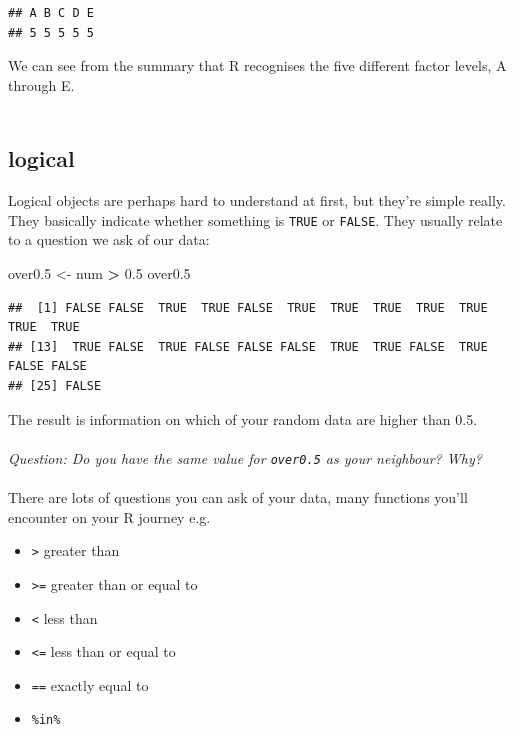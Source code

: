 \documentclass[
]{book}
\newenvironment{Shaded}{\begin{snugshade}}{\end{snugshade}}
\newcommand{\FloatTok}[1]{\textcolor[rgb]{0.00,0.00,0.81}{#1}}
\newcommand{\NormalTok}[1]{#1}
\newcommand{\OperatorTok}[1]{\textcolor[rgb]{0.81,0.36,0.00}{\textbf{#1}}}
\newcommand{\StringTok}[1]{\textcolor[rgb]{0.31,0.60,0.02}{#1}}
\providecommand{\tightlist}{%
  \setlength{\itemsep}{0pt}\setlength{\parskip}{0pt}}
\begin{document}
\begin{verbatim}
## A B C D E 
## 5 5 5 5 5
\end{verbatim}

We can see from the summary that R recognises the five different factor levels,
A through E.\\
~\\

\hypertarget{logical}{%
\subsection{logical}\label{logical}}

Logical objects are perhaps hard to understand at first, but they're simple
really. They basically indicate whether something is \texttt{TRUE} or \texttt{FALSE}. They
usually relate to a question we ask of our data:

\begin{Shaded}
\begin{Highlighting}[]
\NormalTok{over0}\FloatTok{.5}\NormalTok{ <-}\StringTok{ }\NormalTok{num }\OperatorTok{>}\StringTok{ }\FloatTok{0.5}
\NormalTok{over0}\FloatTok{.5}
\end{Highlighting}
\end{Shaded}

\begin{verbatim}
##  [1] FALSE FALSE  TRUE  TRUE FALSE  TRUE  TRUE  TRUE  TRUE  TRUE  TRUE  TRUE
## [13]  TRUE FALSE  TRUE FALSE FALSE FALSE  TRUE  TRUE FALSE  TRUE FALSE FALSE
## [25] FALSE
\end{verbatim}

The result is information on which of your random data are higher than 0.5.\\
~\\

\emph{Question: Do you have the same value for \texttt{over0.5} as your neighbour? Why?}\\
~\\

There are lots of questions you can ask of your data, many functions you'll
encounter on your R journey e.g.~

\begin{itemize}
\tightlist
\item
  \texttt{\textgreater{}} greater than
\item
  \texttt{\textgreater{}=} greater than or equal to
\item
  \texttt{\textless{}} less than
\item
  \texttt{\textless{}=} less than or equal to
\item
  \texttt{==} exactly equal to
\item
  \texttt{\%in\%}~\\
\end{itemize}
\end{document}

